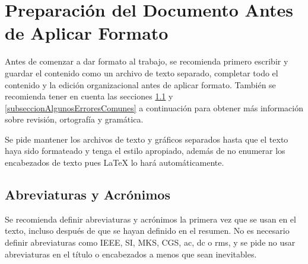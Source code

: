 \documentclass[letterpaper, 10pt, conference]{IEEEtran} %
\begin{document}
	\section{Preparación del Documento Antes de Aplicar Formato} \label{seccionPreparacionDelDocumentoAntesDeAplicarFormato}
	Antes de comenzar a dar formato al trabajo, se recomienda primero escribir y guardar el contenido como un archivo de texto separado, completar todo el contenido y la edición organizacional antes de aplicar formato. También se recomienda tener en cuenta las secciones \ref{subseccionAbreviaturasYAcronimos} y \ref{subseccionAlgunosErroresComunes} a continuación para obtener más información sobre revisión, ortografía y gramática.
	
	Se pide mantener los archivos de texto y gráficos separados hasta que el texto haya sido formateado y tenga el estilo apropiado, además de no enumerar los encabezados de texto pues {\LaTeX} lo hará automáticamente.
	
	\subsection{Abreviaturas y Acrónimos} \label{subseccionAbreviaturasYAcronimos}
	Se recomienda definir abreviaturas y acrónimos la primera vez que se usan en el texto, incluso después de que se hayan definido en el resumen. No es necesario definir abreviaturas como IEEE, SI, MKS, CGS, ac, dc o rms, y se pide no usar abreviaturas en el título o encabezados a menos que sean inevitables.
	
\end{document}
